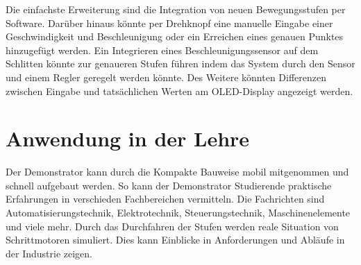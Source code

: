 Die einfachste Erweiterung sind die Integration von neuen Bewegungsstufen per Software. Darüber hinaus könnte per Drehknopf eine manuelle Eingabe einer Geschwindigkeit und Beschleunigung oder ein Erreichen eines genauen Punktes hinzugefügt werden. Ein Integrieren eines Beschleunigungssensor auf dem Schlitten könnte zur genaueren Stufen führen indem das System durch den Sensor und einem Regler geregelt werden könnte. Des Weitere könnten Differenzen zwischen Eingabe und tatsächlichen Werten am OLED-Display angezeigt werden. 

\section{Anwendung in der Lehre}

Der Demonstrator kann durch die Kompakte Bauweise mobil mitgenommen und schnell aufgebaut werden. So kann der Demonstrator Studierende praktische Erfahrungen in verschieden Fachbereichen vermitteln. Die Fachrichten sind Automatisierungstechnik, Elektrotechnik, Steuerungstechnik, Maschinenelemente und viele mehr. Durch das Durchfahren der Stufen werden reale Situation von Schrittmotoren simuliert. Dies kann Einblicke in Anforderungen und Abläufe in der Industrie zeigen. 
